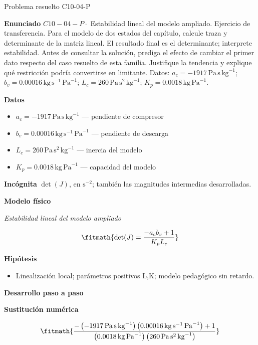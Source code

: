 \documentclass[10pt,openany]{book}
\begin{document}
\begin{studiumworked}{Problema resuelto C10-04-P}


\noindent\textbf{Enunciado}
\(C10-04-P \cdot\) Estabilidad lineal del modelo ampliado. Ejercicio de transferencia. Para el modelo de dos estados del capítulo, calcule traza y determinante de la matriz lineal. El resultado final es el determinante; interprete estabilidad. Antes de consultar la solución, prediga el efecto de cambiar el primer dato respecto del caso resuelto de esta familia. Justifique la tendencia y explique qué restricción podría convertirse en limitante. Datos: \(a_c=-1917\, \mathrm{Pa}\,\mathrm{s}\,\mathrm{kg}^{-1}\); \(b_v=0.00016\, \mathrm{kg}\,\mathrm{s}^{-1}\,\mathrm{Pa}^{-1}\); \(L_c=260\, \mathrm{Pa}\,\mathrm{s}^{2}\,\mathrm{kg}^{-1}\); \(K_p=0.0018\, \mathrm{kg}\,\mathrm{Pa}^{-1}\).

\noindent\textbf{Datos}
\begin{itemize}
\item $a_c = -1917\,\mathrm{Pa}\,\mathrm{s}\,\mathrm{kg}^{-1}$ — pendiente de compresor
\item $b_v = 0.00016\,\mathrm{kg}\,\mathrm{s}^{-1}\,\mathrm{Pa}^{-1}$ — pendiente de descarga
\item $L_c = 260\,\mathrm{Pa}\,\mathrm{s}^{2}\,\mathrm{kg}^{-1}$ — inercia del modelo
\item $K_p = 0.0018\,\mathrm{kg}\,\mathrm{Pa}^{-1}$ — capacidad del modelo
\end{itemize}

\noindent\textbf{Incógnita}
$\det(J)$, en $\mathrm{s^{-2}}$; también las magnitudes intermedias desarrolladas.

\noindent\textbf{Modelo físico}

\noindent\textit{Estabilidad lineal del modelo ampliado}

\[
\fitmath{\det(J)=\frac{- a_c b_v + 1}{K_p L_c}}
\]

\noindent\textbf{Hipótesis}
\begin{itemize}
\item Linealización local; parámetros positivos L,K; modelo pedagógico sin retardo.
\end{itemize}

\noindent\textbf{Desarrollo paso a paso}



\noindent\textbf{Sustitución numérica}

\[
\fitmath{\frac{- \left(-1917\,\mathrm{Pa}\,\mathrm{s}\,\mathrm{kg}^{-1}\right) \left(0.00016\,\mathrm{kg}\,\mathrm{s}^{-1}\,\mathrm{Pa}^{-1}\right) + 1}{\left(0.0018\,\mathrm{kg}\,\mathrm{Pa}^{-1}\right) \left(260\,\mathrm{Pa}\,\mathrm{s}^{2}\,\mathrm{kg}^{-1}\right)}}
\]


\end{studiumworked}
\end{document}
